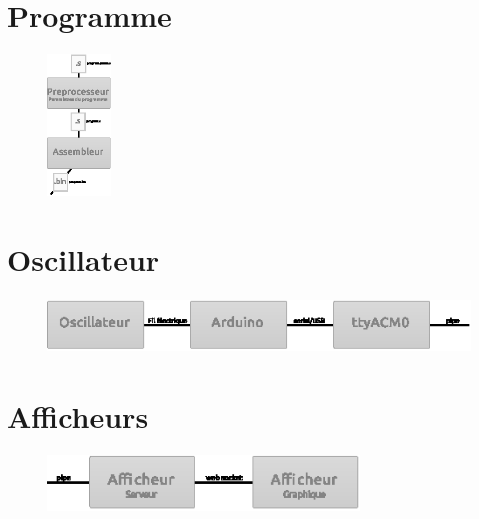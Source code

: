 \documentclass{article}
\begin{document}
\section{Programme}

\begin{figure}
\begin{center}
\includegraphics[width=0.15\textwidth]{zoom_prog.eps}
\end{center}
\end{figure}






\section{Oscillateur}

\begin{figure}[h]
\centering
\includegraphics[height=4em]{zoom_input.eps}
\end{figure}






\section{Afficheurs}

\begin{figure}[h]
\centering
\includegraphics[height=4em]{zoom_output.eps}
\end{figure}
\end{document}

